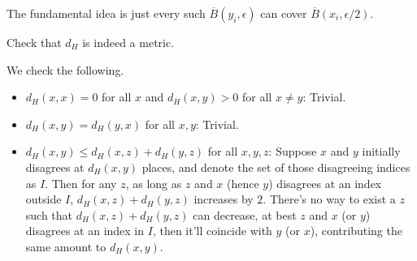 \begin{intuition}
	The fundamental idea is just every such \(\overline{B} (y_i, \epsilon )\) can cover \(\overline{B} (x_i, \epsilon / 2)\).
\end{intuition}

\begin{problem*}[Exercise 4.2.15]\label{ex4.2.15}
	Check that \(d_H\) is indeed a metric.
\end{problem*}
\begin{answer}
	We check the following.
	\begin{itemize}
		\item \(d_H(x, x) = 0\) for all \(x\) and \(d_H(x, y) > 0\) for all \(x \neq y\): Trivial.
		\item \(d_H(x, y) = d_H(y, x)\) for all \(x, y\): Trivial.
		\item \(d_H(x, y) \leq d_H(x, z) + d_H(y, z)\) for all \(x, y, z\): Suppose \(x\) and \(y\) initially disagrees at \(d_H(x, y)\) places, and denote the set of those disagreeing indices as \(I\). Then for any \(z\), as long as \(z\) and \(x\) (hence \(y\)) disagrees at an index outside \(I\), \(d_H(x, z) + d_H(y, z) \) increases by \(2\). There's no way to exist a \(z\) such that \(d_H(x, z) + d_H(y, z)\) can decrease, at best \(z\) and \(x\) (or \(y\)) disagrees at an index in \(I\), then it'll coincide with \(y\) (or \(x\)), contributing the same amount to \(d_H(x, y)\).
	\end{itemize}
\end{answer}

